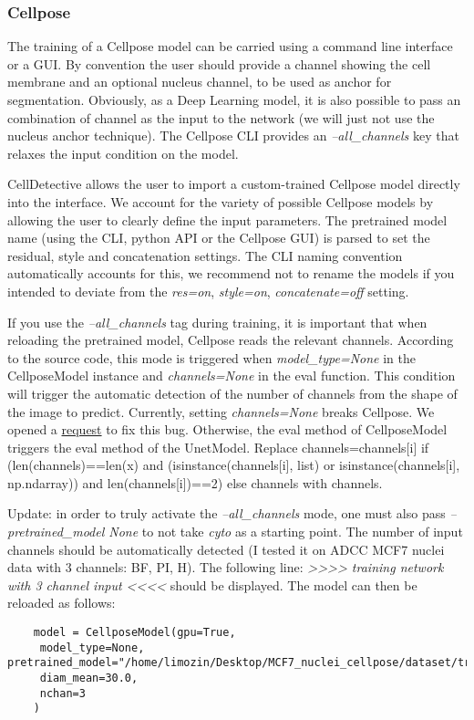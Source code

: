 \documentclass[10pt,a4paper]{article}
\begin{document}
	\subsubsection{Cellpose}
	
	The training of a Cellpose model can be carried using a command line interface or a GUI. By convention the user should provide a channel showing the cell membrane and an optional nucleus channel, to be used as anchor for segmentation. Obviously, as a Deep Learning model, it is also possible to pass an combination of channel as the input to the network (we will just not use the nucleus anchor technique). The Cellpose CLI provides an \textit{--all\_channels} key that relaxes the input condition on the model. 
	
	CellDetective allows the user to import a custom-trained Cellpose model directly into the interface. We account for the variety of possible Cellpose models by allowing the user to clearly define the input parameters. The pretrained model name (using the CLI, python API or the Cellpose GUI) is parsed to set the residual, style and concatenation settings. The CLI naming convention automatically accounts for this, we recommend not to rename the models if you intended to deviate from the \textit{res=on}, \textit{style=on}, \textit{concatenate=off} setting. 
	
	If you use the \textit{--all\_channels} tag during training, it is important that when reloading the pretrained model, Cellpose reads the relevant channels. According to the source code, this mode is triggered when \textit{model\_type=None} in the CellposeModel instance and \textit{channels=None} in the eval function. This condition will trigger the automatic detection of the number of channels from the shape of the image to predict. Currently, setting \textit{channels=None} breaks Cellpose. We opened a \href{https://github.com/MouseLand/cellpose/issues/762}{request} to fix this bug. Otherwise, the eval method of CellposeModel triggers the eval method of the UnetModel. Replace channels=channels[i] if (len(channels)==len(x) and (isinstance(channels[i], list) or isinstance(channels[i], np.ndarray)) and len(channels[i])==2) else channels with channels.
	
	\par{}Update: in order to truly
 activate the \textit{--all\_channels} mode, one must also pass \textit{--pretrained\_model None} to not take \textit{cyto} as a starting point. The number of input channels should be automatically detected (I tested it on ADCC MCF7 nuclei data with 3 channels: BF, PI, H). The following line:  \textit{>>>> training network with 3 channel input <<<<} should be displayed. The model can then be reloaded as follows:
	
	\begin{verbatim}
	model = CellposeModel(gpu=True, 
	 model_type=None, pretrained_model="/home/limozin/Desktop/MCF7_nuclei_cellpose/dataset/train/augmented/models/cellpose_residual_on_style_on_concatenation_off_augmented_2023_08_09_10_28_34.822385",
	 diam_mean=30.0, 
	 nchan=3
	)
	\end{verbatim}
\end{document}
